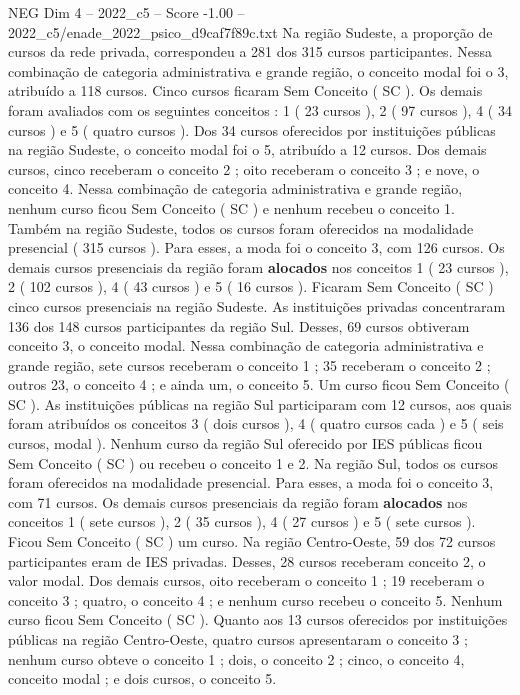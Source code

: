 \begin{textsample}{NEG Dim 4 – 2022\_c5 – Score -1.00 – 2022\_c5/enade\_2022\_psico\_d9caf7f89c.txt}
Na região Sudeste, a proporção de cursos da rede privada, correspondeu a 281 dos 315 cursos participantes.
Nessa combinação de categoria administrativa e grande região, o conceito modal foi o 3, atribuído a 118 cursos.
Cinco cursos ficaram Sem Conceito ( SC ).
Os demais foram avaliados com os seguintes conceitos : 1 ( 23 cursos ), 2 ( 97 cursos ), 4 ( 34 cursos ) e 5 ( quatro cursos ).
Dos 34 cursos oferecidos por instituições públicas na região Sudeste, o conceito modal foi o 5, atribuído a 12 cursos.
Dos demais cursos, cinco receberam o conceito 2 ; oito receberam o conceito 3 ; e nove, o conceito 4.
Nessa combinação de categoria administrativa e grande região, nenhum curso ficou Sem Conceito ( SC ) e nenhum recebeu o conceito 1.
Também na região Sudeste, todos os cursos foram oferecidos na modalidade presencial ( 315 cursos ).
Para esses, a moda foi o conceito 3, com 126 cursos.
Os demais cursos presenciais da região foram \textbf{alocados} nos conceitos 1 ( 23 cursos ), 2 ( 102 cursos ), 4 ( 43 cursos ) e 5 ( 16 cursos ).
Ficaram Sem Conceito ( SC ) cinco cursos presenciais na região Sudeste.
As instituições privadas concentraram 136 dos 148 cursos participantes da região Sul.
Desses, 69 cursos obtiveram conceito 3, o conceito modal.
Nessa combinação de categoria administrativa e grande região, sete cursos receberam o conceito 1 ; 35 receberam o conceito 2 ; outros 23, o conceito 4 ; e ainda um, o conceito 5.
Um curso ficou Sem Conceito ( SC ).
As instituições públicas na região Sul participaram com 12 cursos, aos quais foram atribuídos os conceitos 3 ( dois cursos ), 4 ( quatro cursos cada ) e 5 ( seis cursos, modal ).
Nenhum curso da região Sul oferecido por IES públicas ficou Sem Conceito ( SC ) ou recebeu o conceito 1 e 2.
Na região Sul, todos os cursos foram oferecidos na modalidade presencial.
Para esses, a moda foi o conceito 3, com 71 cursos.
Os demais cursos presenciais da região foram \textbf{alocados} nos conceitos 1 ( sete cursos ), 2 ( 35 cursos ), 4 ( 27 cursos ) e 5 ( sete cursos ).
Ficou Sem Conceito ( SC ) um curso.
Na região Centro-Oeste, 59 dos 72 cursos participantes eram de IES privadas.
Desses, 28 cursos receberam conceito 2, o valor modal.
Dos demais cursos, oito receberam o conceito 1 ; 19 receberam o conceito 3 ; quatro, o conceito 4 ; e nenhum curso recebeu o conceito 5.
Nenhum curso ficou Sem Conceito ( SC ).
Quanto aos 13 cursos oferecidos por instituições públicas na região Centro-Oeste, quatro cursos apresentaram o conceito 3 ; nenhum curso obteve o conceito 1 ; dois, o conceito 2 ; cinco, o conceito 4, conceito modal ; e dois cursos, o conceito 5.

\end{textsample}
